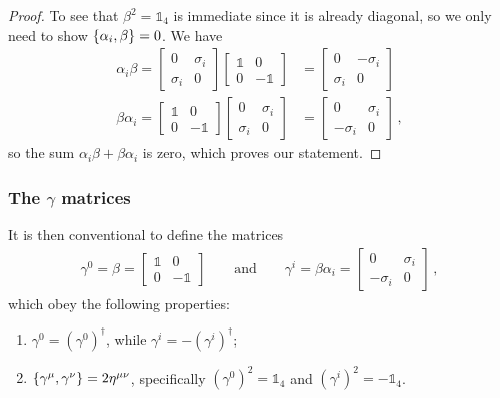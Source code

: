 \documentclass[main.tex]{subfiles}
\begin{document}
\begin{proof}
To see that \(\beta^2 = \mathbb{1}_{4}\) is immediate since it is already diagonal, so we only need to show \(\qty{\alpha_{i}, \beta } = 0\). We have 
%
\begin{subequations}
\begin{align}
\alpha_{i} \beta =
\left[\begin{array}{cc}
0 & \sigma_{i} \\ 
\sigma_{i} & 0
\end{array}\right]
\left[\begin{array}{cc}
\mathbb{1} & 0 \\ 
0 & -\mathbb{1}
\end{array}\right]
&= 
\left[\begin{array}{cc}
0 & -\sigma_{i} \\ 
\sigma_{i} & 0
\end{array}\right] \\
\beta \alpha_{i} =
\left[\begin{array}{cc}
\mathbb{1} & 0 \\ 
0 & -\mathbb{1}
\end{array}\right]
\left[\begin{array}{cc}
0 & \sigma_{i} \\ 
\sigma_{i} & 0
\end{array}\right]
&= 
\left[\begin{array}{cc}
0 & \sigma_{i} \\ 
-\sigma_{i} & 0
\end{array}\right]
\,,
\end{align}
\end{subequations}
%
so the sum \(\alpha_{i} \beta + \beta \alpha_{i}\) is zero, which proves our statement. 
\end{proof}

\subsubsection{The \(\gamma \) matrices}

It is then conventional to define the matrices 
%
\begin{subequations}
\begin{align}
\gamma^{0} = \beta = \left[\begin{array}{cc}
\mathbb{1} & 0 \\ 
0 & -\mathbb{1}
\end{array}\right]
\qquad \text{and} \qquad
\gamma^{i} = \beta \alpha_{i} = \left[\begin{array}{cc}
0 & \sigma_{i} \\ 
-\sigma_{i} & 0
\end{array}\right]
\,,
\end{align}
\end{subequations}
%
which obey the following properties: 
\begin{enumerate}
  \item \(\gamma^{0} = (\gamma^{0}) ^\dag\), while \(\gamma^{i} = - (\gamma^{i} ) ^\dag\);
  \item \(\qty{\gamma^{\mu }, \gamma^{\nu }} = 2 \eta^{\mu \nu }\), specifically \((\gamma^{0})^2 = \mathbb{1}_{4}\) and \((\gamma^{i})^2 = - \mathbb{1}_{4}\). 
\end{enumerate}
\end{document}
